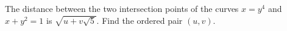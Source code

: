 The distance between the two intersection points of the curves $x=y^4$ and $x+y^2=1$ is $\sqrt{u+v\sqrt5}$. Find the ordered pair $(u,v)$.
